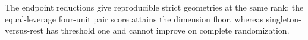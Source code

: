 The endpoint reductions give reproducible strict geometries at the same rank: the equal-leverage four-unit pair score attains the dimension floor, whereas singleton-versus-rest has threshold one and cannot improve on complete randomization.